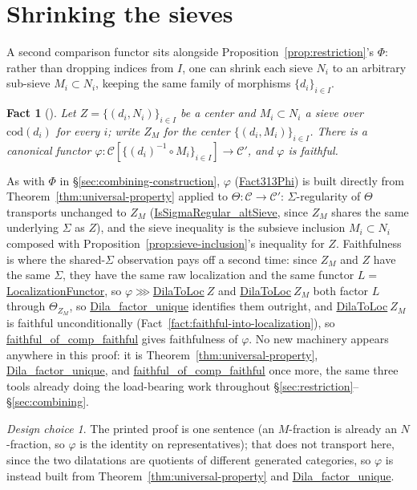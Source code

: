 \documentclass[11pt]{amsart}
\newcommand{\lc}[1]{\url{#1}}
\theoremstyle{plain}
\newtheorem{fact}[theorem]{Fact}
\theoremstyle{definition}
\theoremstyle{remark}
\newtheorem*{designchoice}{Design choice}
\newcommand{\calC}{\mathcal C}
\newcommand{\cod}{\mathrm{cod}}
\begin{document}
\section{Shrinking the sieves}
\label{sec:subsieve}

A second comparison functor sits alongside Proposition~\ref{prop:restriction}'s $\Phi$:
rather than dropping indices from $I$, one can shrink each sieve $N_i$ to an arbitrary
sub-sieve $M_i \subset N_i$, keeping the same family of morphisms $\{d_i\}_{i\in I}$.

\begin{fact}[{\citep[Fact~3.13]{Mayeux}}]
\label{fact:subsieve}
Let $Z=\{(d_i,N_i)\}_{i\in I}$ be a center and $M_i \subset N_i$ a sieve over $\cod(d_i)$ for
every $i$; write $Z_M$ for the center $\{(d_i,M_i)\}_{i\in I}$. There is a canonical functor
$\varphi : \calC[\{(d_i)^{-1}\circ M_i\}_{i\in I}] \to \calC'$, and $\varphi$ is faithful.
\end{fact}

As with $\Phi$ in \S\ref{sec:combining-construction}, $\varphi$ (\lc{Fact313Phi}) is built
directly from Theorem~\ref{thm:universal-property} applied to $\Theta : \calC \to \calC'$:
$\Sigma$-regularity of $\Theta$ transports unchanged to $Z_M$ (\lc{IsSigmaRegular_altSieve},
since $Z_M$ shares the same underlying $\Sigma$ as $Z$), and the sieve inequality is the
subsieve inclusion $M_i \subset N_i$ composed with Proposition~\ref{prop:sieve-inclusion}'s
inequality for $Z$. Faithfulness is where the shared-$\Sigma$ observation pays off a second
time: since $Z_M$ and $Z$ have the same $\Sigma$, they have the same raw localization
and the same functor $L=$\lc{LocalizationFunctor}, so $\varphi \ggg$\lc{DilaToLoc}$\ Z$ and
\lc{DilaToLoc}$\ Z_M$ both factor $L$ through $\Theta_{Z_M}$, so \lc{Dila_factor_unique}
identifies them outright, and \lc{DilaToLoc}$\ Z_M$ is faithful unconditionally
(Fact~\ref{fact:faithful-into-localization}), so \lc{faithful_of_comp_faithful} gives
faithfulness of $\varphi$. No new machinery appears anywhere in this proof: it is
Theorem~\ref{thm:universal-property}, \lc{Dila_factor_unique}, and
\lc{faithful_of_comp_faithful} once more, the same three tools already doing the load-bearing
work throughout \S\ref{sec:restriction}--\S\ref{sec:combining}.

\begin{designchoice}
The printed proof is one sentence (an $M$-fraction is already an $N$-fraction, so $\varphi$ is
the identity on representatives); that does not transport here, since the two dilatations are
quotients of different generated categories, so $\varphi$ is instead built from
Theorem~\ref{thm:universal-property} and \lc{Dila_factor_unique}.
\end{designchoice}
\end{document}
